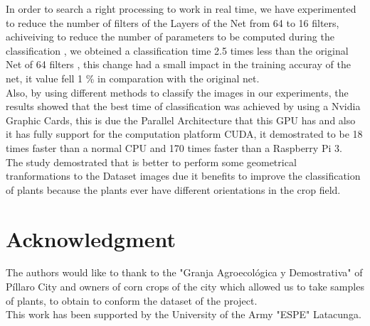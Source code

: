 \documentclass[conference]{IEEEtran}
\begin{document}
In order to search a right processing to work in real time, we have experimented to reduce the number of filters of the Layers of the Net from 64 to 16 filters, achiveiving to reduce the number of parameters to be computed during the classification , we obteined a classification time 2.5 times less than the original Net of 64 filters , this change had a small impact in the training accuray of the net, it value fell 1 \% in comparation with the original net. \\

Also, by using different methods to classify the images in our experiments, the results showed that the best time of classification was achieved by using a Nvidia Graphic Cards, this is due the Parallel Architecture that this GPU has and also it has fully support for the computation platform CUDA, it demostrated to be 18 times faster than a normal CPU and 170 times faster than a Raspberry Pi 3. \\

The study demostrated that is better to perform some geometrical tranformations to the Dataset images due it benefits to improve the  classification of plants because the plants ever have different orientations in the crop field. 






\section*{Acknowledgment}

The authors would like to thank to the "Granja Agroecol\'ogica y Demostrativa" of P\'illaro City and owners of corn crops of the city which allowed us to take samples of plants, to obtain to conform the dataset of the project. \\

This work has been supported by the University of the Army "ESPE"  Latacunga.  




%
%
%







\end{document}
